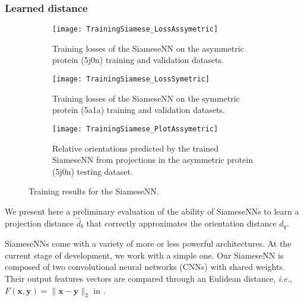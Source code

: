 \subsubsection{Learned distance}\label{sec:results:distance-estimation:learned}


\begin{figure}
    \centering
    \begin{subfigure}[t]{0.4\textwidth}
        \texttt{[image: TrainingSiamese\_LossAssymetric]}
        \caption{Training losses of the SiameseNN on the asymmetric protein (5j0n) training and validation datasets.}
        \label{fig:losses-siamese-assym}
    \end{subfigure} \quad \quad
    \begin{subfigure}[t]{0.4\textwidth}
        \texttt{[image: TrainingSiamese\_LossSymetric]}
        \caption{Training losses of the SiameseNN on the symmetric protein (5a1a) training and validation datasets.}
        \label{fig:losses-siamese-sym}
    \end{subfigure} \vspace{0.45cm}
    \begin{subfigure}[t]{0.4\textwidth}
        \texttt{[image: TrainingSiamese\_PlotAssymetric]}
        \caption{Relative orientations predicted by the trained SiameseNN from projections in the asymmetric protein (5j0n) testing dataset. }
        \label{fig:learned-distance-siamese}
    \end{subfigure} \vspace{0.35cm}
    \caption{Training results for the SiameseNN.}
    \label{fig:losses-siamese}
\end{figure}

We present here a preliminary evaluation of the ability of SiameseNNs to learn a projection distance $\widehat{d}_b$ that correctly approximates the orientation distance $d_q$.

SiameseNNs come with a variety of more or less powerful architectures. At the current stage of development, we work with a simple one. Our SiameseNN is composed of two convolutional neural networks (CNNs) with shared weights. Their output features vectors are compared through an Eulidean distance, \textit{i.e.}, $F(\mathbf{x},\mathbf{y})=\lVert \mathbf{x}-\mathbf{y}\rVert_2$ in .

